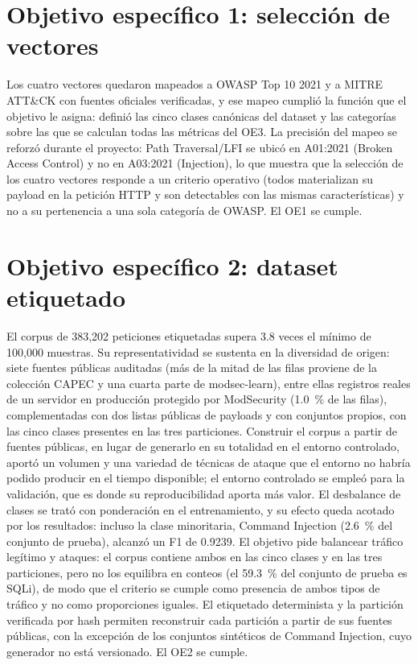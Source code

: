 \section{Objetivo específico 1: selección de vectores}

Los cuatro vectores quedaron mapeados a OWASP Top 10 2021 y a MITRE ATT\&CK con fuentes
oficiales verificadas, y ese mapeo cumplió la función que el objetivo le asigna: definió las cinco
clases canónicas del dataset y las categorías sobre las que se calculan todas las métricas del
OE3. La precisión del mapeo se reforzó durante el proyecto: Path Traversal/LFI se ubicó en
A01:2021 (Broken Access Control) y no en A03:2021 (Injection), lo que muestra que la selección de
los cuatro vectores responde a un criterio operativo (todos materializan su payload en la petición
HTTP y son detectables con las mismas características) y no a su pertenencia a una sola categoría
de OWASP. El OE1 se cumple.

\section{Objetivo específico 2: dataset etiquetado}

El corpus de 383{,}202 peticiones etiquetadas supera 3.8 veces el mínimo de 100{,}000 muestras. Su
representatividad se sustenta en la diversidad de origen: siete fuentes públicas auditadas (más de
la mitad de las filas proviene de la colección CAPEC y una cuarta parte de modsec-learn), entre
ellas registros reales de un servidor en producción protegido por ModSecurity \cite{lucz2025}
(1.0~\% de las filas), complementadas con dos listas públicas de payloads y con conjuntos propios,
con las cinco clases presentes en las tres particiones. Construir el corpus a partir de fuentes
públicas, en lugar de generarlo en su totalidad en el entorno controlado, aportó un volumen y una
variedad de técnicas de ataque que el entorno no habría podido producir en el tiempo disponible;
el entorno controlado se empleó para la validación, que es donde su reproducibilidad aporta más
valor. El desbalance de clases se trató con ponderación en el entrenamiento, y su efecto queda
acotado por los resultados: incluso la clase minoritaria, Command Injection (2.6~\% del conjunto de
prueba), alcanzó un F1 de 0.9239. El objetivo pide balancear tráfico legítimo y ataques: el corpus contiene
ambos en las cinco clases y en las tres particiones, pero no los equilibra en conteos (el 59.3~\%
del conjunto de prueba es SQLi), de modo que el criterio se cumple como presencia de ambos tipos de
tráfico y no como proporciones iguales. El etiquetado determinista y la partición verificada por hash
permiten reconstruir cada partición a partir de sus fuentes públicas, con la excepción de los
conjuntos sintéticos de Command Injection, cuyo generador no está versionado. El OE2 se cumple.

